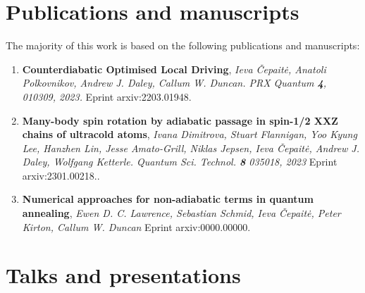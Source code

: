 \section{Publications and manuscripts}

The majority of this work is based on the following publications and manuscripts:

\begin{enumerate}
    \item \textbf{Counterdiabatic Optimised Local Driving}, \textit{Ieva Čepaitė, Anatoli Polkovnikov, Andrew J. Daley, Callum W. Duncan. PRX Quantum \textbf{4}, 010309, 2023.} Eprint arxiv:2203.01948. \cite{cepaite_counterdiabatic_2023}
    \item \textbf{Many-body spin rotation by adiabatic passage in
    spin-1/2 XXZ chains of ultracold atoms}, \textit{Ivana Dimitrova, Stuart Flannigan, Yoo Kyung Lee, Hanzhen Lin,  Jesse Amato-Grill, Niklas Jepsen, Ieva Čepaitė, Andrew J. Daley, Wolfgang Ketterle. Quantum Sci. Technol. \textbf{8} 035018, 2023} Eprint arxiv:2301.00218.\cite{dimitrova_many-body_2023}.
    \item \textbf{Numerical approaches for non-adiabatic terms in quantum annealing}, \textit{Ewen D. C. Lawrence, Sebastian Schmid, Ieva Čepaitė, Peter Kirton, Callum W. Duncan} Eprint arxiv:0000.00000.
\end{enumerate}

\section{Talks and presentations}

